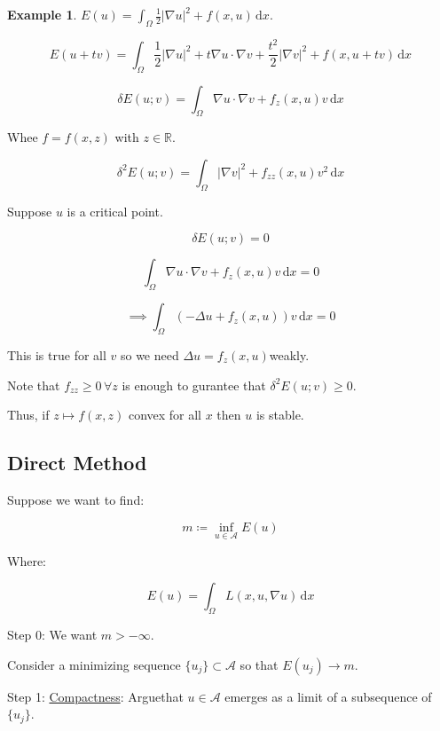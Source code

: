 \documentclass{article}
\theoremstyle{definition}
\newtheorem{example}{Example}
\begin{document}
\begin{example}
    \(E(u) = \int_{\Omega} \frac{1}{2}\vert \nabla u \vert ^2 + f(x,u) \,\mathrm{d}x \).

    \[
        E(u+tv) = \int_{\Omega} \frac{1}{2} \vert \nabla u \vert ^2 + t \nabla u \cdot \nabla v + \frac{t^2}{2}\vert \nabla v \vert ^2 + f(x,u+tv) \,\mathrm{d}x 
    \]

    \[
        \delta E(u;v) = \int_{\Omega} \nabla u \cdot \nabla v +f_z(x,u)v \,\mathrm{d}x
    \] 

    Whee \(f = f(x,z)\) with \(z\in \mathbb{R}\).

    \[
        \delta^2 E(u;v) = \int_{\Omega} \vert \nabla v \vert ^2 + f_{z z} (x,u) v^2 \,\mathrm{d}x 
    \]

    Suppose \(u\) is a critical point.

    \[
        \delta E(u;v) = 0
    \]

    \[
        \int_{\Omega} \nabla u \cdot \nabla v +f_z(x,u)v \,\mathrm{d}x = 0
    \]

    \[
        \implies \int_{\Omega} \left( - \Delta u + f_z(x,u) \right) v \,\mathrm{d}x = 0
    \]

    This is true for all \(v\) so we need \(\Delta u = f_z(x,u)\)weakly.

    Note that \(f_{z z} \geq 0\, \forall z\) is enough to gurantee that \(\delta^2 E(u;v) \geq 0\).
    
    Thus, if \(z \mapsto f(x,z)\) convex for all \(x\) then \(u\) is stable.

\end{example}

\subsection*{Direct Method}

Suppose we want to find:

\[
    m \coloneqq \inf_{u\in \mathcal{A}} E(u)
\]

Where:

\[
    E(u) = \int_{\Omega} L(x,u,\nabla u) \,\mathrm{d}x 
\]

Step 0: We want \(m > - \infty\).

Consider a minimizing sequence \(\{ u_j \} \subset \mathcal{A}\) so that \(E(u_j) \to m\).

Step 1: \underline{Compactness}: Arguethat \(u\in \mathcal{A}\) emerges as a limit of a subsequence of \(\{ u_j \}\).
\end{document}
